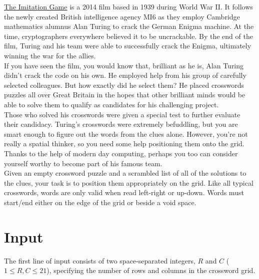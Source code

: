

\noindent \href{https://www.imdb.com/title/tt2084970/}{The Imitation Game} is a 2014 film based in 1939 during World War II. It follows the newly created British intelligence agency MI6 as they employ Cambridge mathematics alumnus Alan Turing to crack the German Enigma machine. At the time, cryptographers everywhere believed it to be uncrackable. By the end of the film, Turing and his team were able to successfully crack the Enigma, ultimately winning the war for the allies.\\

If you have seen the film, you would know that, brilliant as he is, Alan Turing didn't crack the code on his own. He employed help from his group of carefully selected colleagues. But how exactly did he select them? He placed crosswords puzzles all over Great Britain in the hopes that other brilliant minds would be able to solve them to qualify as candidates for his challenging project.\\

Those who solved his crosswords were given a special test to further evaluate their candidacy. Turing's crosswords were extremely befuddling, but you are smart enough to figure out the words from the clues alone. However, you're not really a spatial thinker, so you need some help positioning them onto the grid. Thanks to the help of modern day computing, perhaps you too can consider yourself worthy to become part of his famous team.\\

Given an empty crossword puzzle and a scrambled list of all of the solutions to the clues, your task is to position them appropriately on the grid. Like all typical crosswords, words are only valid when read left-right or up-down. Words must start/end either on the edge of the grid or beside a void space.

\section*{Input}
The first line of input consists of two space-separated integers, $R$ and $C$ ($1 \leq R, C \leq 21$), specifying the number of rows and columns in the crossword grid.\\

